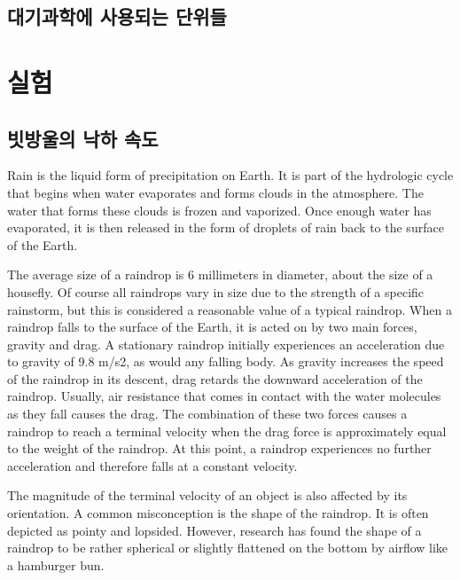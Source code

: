 \section{대기과학에 사용되는 단위들}



\chapter{실험}

\section{빗방울의 낙하 속도}

Rain is the liquid form of precipitation on Earth. It is part of the hydrologic cycle that begins when water evaporates and forms clouds in the atmosphere. The water that forms these clouds is frozen and vaporized. Once enough water has evaporated, it is then released in the form of droplets of rain back to the surface of the Earth.

The average size of a raindrop is 6 millimeters in diameter, about the size of a housefly. Of course all raindrops vary in size due to the strength of a specific rainstorm, but this is considered a reasonable value of a typical raindrop. When a raindrop falls to the surface of the Earth, it is acted on by two main forces, gravity and drag. A stationary raindrop initially experiences an acceleration due to gravity of 9.8 m/s2, as would any falling body. As gravity increases the speed of the raindrop in its descent, drag retards the downward acceleration of the raindrop. Usually, air resistance that comes in contact with the water molecules as they fall causes the drag. The combination of these two forces causes a raindrop to reach a terminal velocity when the drag force is approximately equal to the weight of the raindrop. At this point, a raindrop experiences no further acceleration and therefore falls at a constant velocity.

The magnitude of the terminal velocity of an object is also affected by its orientation. A common misconception is the shape of the raindrop. It is often depicted as pointy and lopsided. However, research has found the shape of a raindrop to be rather spherical or slightly flattened on the bottom by airflow like a hamburger bun.

